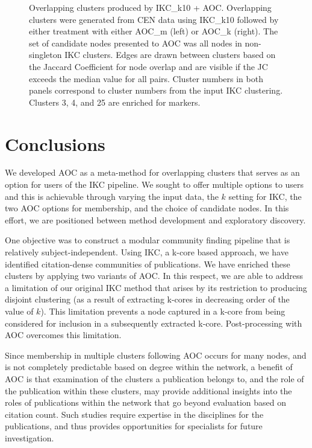 \documentclass[12pt, oneside]{article}   	%
\begin{document}
\begin{figure}[H]
\begin{subfigure}[t]{0.48\textwidth}
\end{subfigure}
\caption{Overlapping clusters produced by IKC\_k10 + AOC.  Overlapping clusters were generated from CEN data using IKC\_k10 followed by either treatment with either AOC\_m (left) or AOC\_k (right). The set of candidate nodes presented to AOC was all nodes in non-singleton IKC clusters. Edges are drawn between clusters based on the Jaccard Coefficient for node overlap and are visible if the JC exceeds the median value for all pairs. Cluster numbers in both panels correspond to cluster numbers from the input IKC clustering. Clusters 3, 4, and 25 are enriched for markers.}
\label{fig:overlapping}
\end{figure}
		
\clearpage
	
\section{Conclusions} We developed AOC as a meta-method for overlapping clusters that serves as an option for users of the IKC pipeline. We sought to offer multiple options to users and this is achievable through varying the input data, the $k$ setting for IKC, the two AOC  options for membership, and the choice of candidate nodes. In this effort, we are positioned between method development and exploratory discovery. 

One objective was to construct a modular community finding pipeline that is relatively subject-independent. Using IKC, a k-core based approach, we have identified citation-dense communities of publications. We have enriched these clusters by applying two variants of AOC. In this respect, we are able to address a limitation of our original IKC method that arises by its restriction to producing disjoint clustering (as a result of extracting k-cores in decreasing order of the value of $k$). This limitation prevents a node captured in a k-core from being considered for inclusion in a subsequently extracted k-core. Post-processing with AOC overcomes this limitation.

Since membership in multiple clusters following AOC occurs for many nodes, and is not completely predictable based on degree within the network, a benefit of AOC is that examination of the clusters a publication belongs to, and the role of the publication within these clusters,  may provide additional insights into the roles of publications within the network that go beyond evaluation based on citation count.
Such studies require expertise in the disciplines for the publications, and thus provides opportunities for specialists for future investigation.
\end{document}
